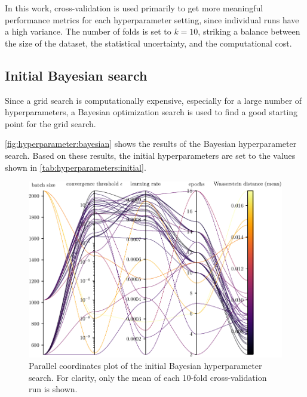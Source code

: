 In this work,
cross-validation is used primarily to get more meaningful performance metrics
for each hyperparameter setting,
  since individual runs have a high variance.
The number of folds is set to $k = 10$,
  striking a balance between
    the size of the dataset,
    the statistical uncertainty,
    and the computational cost.


\subsection{Initial Bayesian search} \label{sec:hyperparameters:initial_bayesian}
Since a grid search is computationally expensive,
  especially for a large number of hyperparameters,
a Bayesian optimization search \cite{wandb_bayesian} is used to find a good starting point for the grid search.

\autoref{fig:hyperparameter:bayesian} shows the results of the Bayesian hyperparameter search.
Based on these results,
the initial hyperparameters are set to the values shown in \autoref{tab:hyperparameters:initial}.


\begin{figure}
  \centering
  \includegraphics[scale=1]{content/plots/hyperparam/combined_pcplot_full.pdf}
  \caption{
    Parallel coordinates plot of the initial Bayesian hyperparameter search.
    For clarity, only the mean of each 10-fold cross-validation run is shown.
  }
  \label{fig:hyperparameter:bayesian}
\end{figure}

